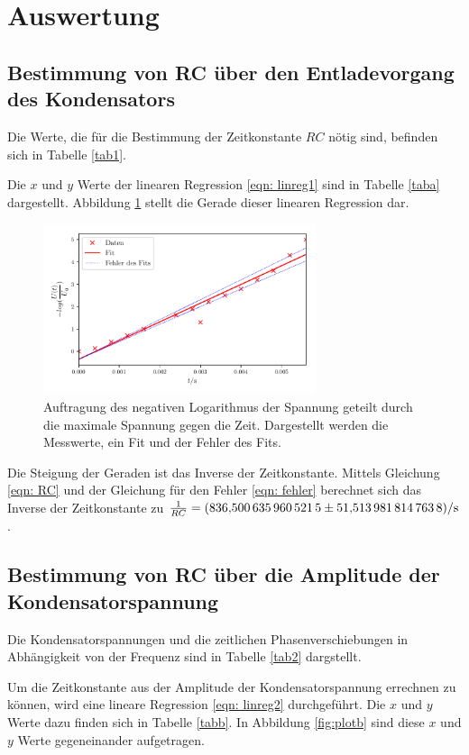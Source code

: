 \section{Auswertung}
\label{sec:Auswertung}


\subsection{Bestimmung von RC über den Entladevorgang des Kondensators}
\label{sec: a}
Die Werte, die für die Bestimmung der Zeitkonstante $RC$ nötig sind, befinden sich in Tabelle \ref{tab1}. %

Die $x$ und $y$ Werte der linearen Regression \eqref{eqn: linreg1} sind in Tabelle \ref{taba} dargestellt.
Abbildung \ref{fig:plota} stellt die Gerade dieser linearen Regression dar.

\begin{figure}
  \centering
  \includegraphics[width=8cm, height=5cm]{build/plota.pdf}
  \caption{Auftragung des negativen Logarithmus der Spannung geteilt durch die maximale Spannung gegen die Zeit.
  Dargestellt werden die Messwerte, ein Fit und der Fehler des Fits.} %
  \label{fig:plota}
\end{figure}

\noindent Die Steigung der Geraden ist das Inverse der Zeitkonstante.
Mittels Gleichung \eqref{eqn: RC} und der Gleichung für den Fehler \eqref{eqn: fehler} berechnet
sich das Inverse der Zeitkonstante zu $\frac{1}{RC} = \SI{836.5006359605215 \pm 51.5139818147638}{\per\second}$.

\subsection{Bestimmung von RC über die Amplitude der Kondensatorspannung}
\label{sec: b}
Die Kondensatorspannungen und die zeitlichen Phasenverschiebungen in Abhängigkeit
von der Frequenz sind in Tabelle \ref{tab2} dargstellt.

Um die Zeitkonstante aus der Amplitude der Kondensatorspannung errechnen zu können, wird eine lineare Regression 
\eqref{eqn: linreg2} durchgeführt. Die $x$ und $y$ Werte dazu finden sich in Tabelle \ref{tabb}.
In Abbildung \ref{fig:plotb} sind diese $x$ und $y$ Werte gegeneinander aufgetragen.


